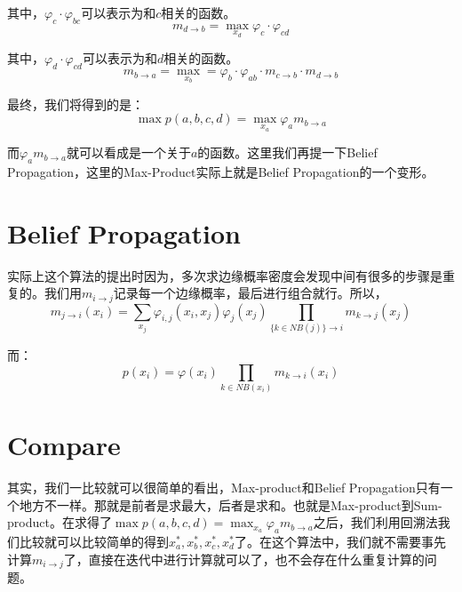 \documentclass[a4paper]{article}
\begin{document}
其中，$\varphi_c\cdot \varphi_{bc}$可以表示为和$c$相关的函数。
\begin{equation}
    m_{d\longrightarrow b}=\max_{x_d} \varphi_c\cdot \varphi_{cd}
\end{equation}

其中，$\varphi_d\cdot \varphi_{cd}$可以表示为和$d$相关的函数。
\begin{equation}
    m_{b\longrightarrow a} = \max_{x_b} = \varphi_b \cdot \varphi_{ab}\cdot m_{c\longrightarrow b}\cdot m_{d\longrightarrow b}
\end{equation}

最终，我们将得到的是：
\begin{equation}
    \max p(a,b,c,d) = \max_{x_a} \varphi_a m_{b\longrightarrow a}
\end{equation}

而$\varphi_a m_{b\longrightarrow a}$就可以看成是一个关于$a$的函数。这里我们再提一下Belief Propagation，这里的Max-Product实际上就是Belief Propagation的一个变形。

\section{Belief Propagation}
实际上这个算法的提出时因为，多次求边缘概率密度会发现中间有很多的步骤是重复的。我们用$m_{i\longrightarrow j}$记录每一个边缘概率，最后进行组合就行。所以，
\begin{equation}
    m_{j\longrightarrow i}(x_i) = \sum_{x_j} \varphi_{i,j}(x_i,x_j)\varphi_j(x_j) \prod_{\{k \in NB(j)\}\longrightarrow i } m_{k\longrightarrow j}(x_j)
\end{equation}

而：
\begin{equation}
    p(x_i) = \varphi(x_i) \prod_{k \in NB(x_i)} m_{k\longrightarrow i}(x_i)
\end{equation}

\section{Compare}
其实，我们一比较就可以很简单的看出，Max-product和Belief Propagation只有一个地方不一样。那就是前者是求最大，后者是求和。也就是Max-product到Sum-product。在求得了$\max p(a,b,c,d) = \max_{x_a} \varphi_a m_{b\longrightarrow a}$之后，我们利用回溯法我们比较就可以比较简单的得到$x_a^\ast,x_b^\ast,x_c^\ast,x_d^\ast$了。在这个算法中，我们就不需要事先计算$m_{i\longrightarrow j}$了，直接在迭代中进行计算就可以了，也不会存在什么重复计算的问题。
\end{document}

